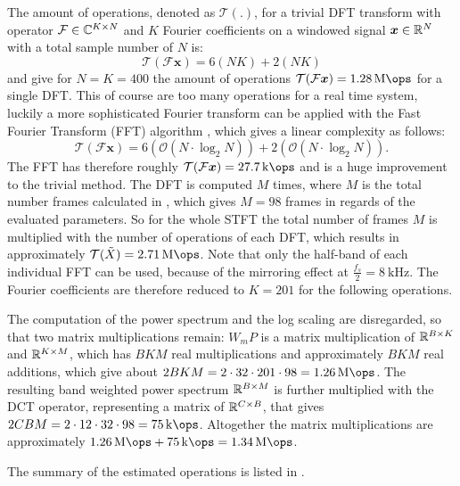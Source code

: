 The amount of operations, denoted as $\mathcal{T(.)}$, for a trivial DFT transform with operator $\mathcal{F} \in \mathbb{C}^{K \times N}$ and $K$ Fourier coefficients on a windowed signal $\bm{x} \in \mathbb{R}^N$ with a total sample number of $N$ is:
\begin{equation}
  \mathcal{T}(\mathcal{F} \bm{x}) = 6 (N K) + 2 (N K)
\end{equation}
and give for $N = K = 400$ the amount of operations $\mathcal{T}(\mathcal{F} \bm{x}) = \SI{1.28}{\mega\ops}$ for a single DFT.
This of course are too many operations for a real time system, luckily a more sophisticated Fourier transform can be applied with the Fast Fourier Transform (FFT) algorithm \cite{Brigham1967}, which gives a linear complexity as follows:
\begin{equation}
  \mathcal{T}(\mathcal{F} \bm{x}) = 6 (\mathcal{O}(N \cdot \log_2 N)) + 2 (\mathcal{O}(N \cdot \log_2 N)).
\end{equation}
The FFT has therefore roughly $\mathcal{T}(\mathcal{F} \bm{x}) = \SI{27.7}{\kilo\ops}$ and is a huge improvement to the trivial method.
The DFT is computed $M$ times, where $M$ is the total number frames calculated in , which gives $M = 98$ frames in regards of the evaluated parameters.
So for the whole STFT the total number of frames $M$ is multiplied with the number of operations of each DFT, which results in approximately $\mathcal{T}(\tilde{X}) = \SI{2.71}{\mega\ops}$.
Note that only the half-band of each individual FFT can be used, because of the mirroring effect at $\frac{f_s}{2} = \SI{8}{\kilo\hertz}$.
The Fourier coefficients are therefore reduced to $K = 201$ for the following operations.

The computation of the power spectrum and the log scaling are disregarded, so that two matrix multiplications remain:
$W_m P$ is a matrix multiplication of $\mathbb{R}^{B \times K}$ and $\mathbb{R}^{K \times M}$, which has $B K M$ real multiplications and approximately $B K M$ real additions, which give about $2 B K M = 2 \cdot 32 \cdot 201 \cdot 98 =  \SI{1.26}{\mega\ops}$.
The resulting band weighted power spectrum $\mathbb{R}^{B \times M}$ is further multiplied with the DCT operator, representing a matrix of $\mathbb{R}^{C \times B}$, that gives $2 C B M = 2 \cdot 12 \cdot 32 \cdot 98 = \SI{75}{\kilo\ops}$.
Altogether the matrix multiplications are approximately $\SI{1.26}{\mega\ops} + \SI{75}{\kilo\ops} = \SI{1.34}{\mega\ops}$.

The summary of the estimated operations is listed in .



